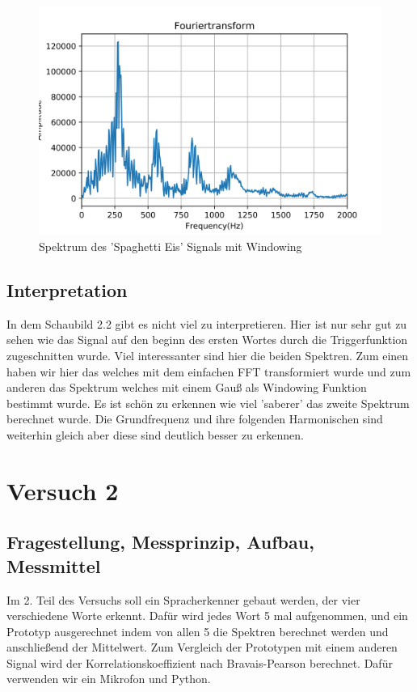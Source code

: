 \documentclass[12pt, oneside, a4paper, \docLanguage]{report}
\begin{document}
\begin{figure}[H]
	\includegraphics[width=1\textwidth]{../Images/SpaghettiEisWindowed.png}
	\caption{Spektrum des 'Spaghetti Eis' Signals mit Windowing}
\end{figure}

\section{Interpretation}
\label{chap:VERSUCH_1_INTERPRETATION}
In dem Schaubild 2.2 gibt es nicht viel zu interpretieren. Hier ist nur sehr gut zu sehen wie das Signal auf den 
beginn des ersten Wortes durch die Triggerfunktion zugeschnitten wurde.\newline
Viel interessanter sind hier die beiden Spektren. Zum einen haben wir hier das welches mit dem einfachen FFT transformiert wurde
und zum anderen das Spektrum welches mit einem Gauß als Windowing Funktion bestimmt wurde.
Es ist schön zu erkennen wie viel 'saberer' das zweite Spektrum berechnet wurde. Die Grundfrequenz und ihre folgenden Harmonischen
sind weiterhin gleich aber diese sind deutlich besser zu erkennen.

%
%
\chapter{Versuch 2}
\label{chap:VERSUCH_2}

\section{Fragestellung, Messprinzip, Aufbau, Messmittel}
\label{chap:VERSUCH_2_FRAGESTELLUNG}
\begin{normalsize}
Im 2. Teil des Versuchs soll ein Spracherkenner gebaut werden, der vier verschiedene Worte erkennt. Dafür wird jedes Wort 5 mal aufgenommen,
und ein Prototyp ausgerechnet indem von allen 5 die Spektren berechnet werden und anschließend der Mittelwert. Zum Vergleich der Prototypen mit einem
anderen Signal wird der Korrelationskoeffizient nach Bravais-Pearson berechnet.
Dafür verwenden wir ein Mikrofon und Python.
\end{normalsize}
\end{document}
